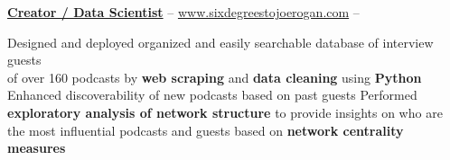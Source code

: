 \documentclass[letterpaper,MMMyyyy,nonstopmode]{simpleresumecv}
\begin{document}
\begin{Body}
\begin{Detail}
\begin{Detail}
\begin{Detail}






\Entry

\href{http://www.sixdegreestojoerogan.com/}
{\textbf{Creator / Data Scientist}} -- \href{http://www.sixdegreestojoerogan.com/}{www.sixdegreestojoerogan.com} \hfill {} -- 








\Gap


\BulletItem
Designed and deployed organized and easily searchable database of interview guests \\of over 160 podcasts by \textbf{web scraping} and \textbf{data cleaning} using \textbf{Python}
\BulletItem
Enhanced discoverability of new podcasts based on past guests
\BulletItem
Performed \textbf{exploratory analysis of network structure} to provide insights on who are the most influential podcasts and guests based on \textbf{network centrality measures}%
\vspace{3.0mm}


\end{Detail}
\end{Detail}
\end{Detail}
\end{Body}
\end{document}
